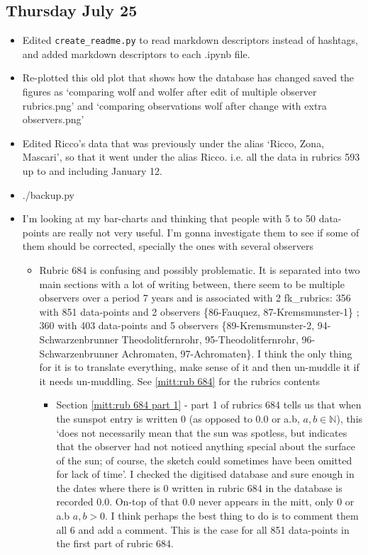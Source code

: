 \documentclass[12pt]{article}
\newcommand{\N}{\mathbb{N}}
\begin{document}
\subsection{Thursday July 25}
\begin{itemize}
    \item Edited \texttt{create\_readme.py} to read markdown descriptors instead of hashtags, and added markdown descriptors to each .ipynb file.
    \item Re-plotted this old plot that shows how the database has changed saved the figures as `comparing wolf and wolfer after edit of multiple observer rubrics.png' and `comparing observations wolf after change with extra observers.png'
    \item Edited Ricco's data that was previously under the alias `Ricco, Zona, Mascari', so that it went under the alias Ricco. i.e. all the data in rubrics 593 up to and including January 12.
    \item ./backup.py
    \item I'm looking at my bar-charts and thinking that people with 5 to 50 data-points are really not very useful. I'm gonna investigate them to see if some of them should be corrected, specially the ones with several observers
    \begin{itemize}
        \item Rubric 684 is confusing and possibly problematic. It is separated into two main sections with a lot of writing between, there seem to be multiple observers over a period 7 years and is associated with 2 fk\_rubrics: 356 with 851 data-points and 2 observers \{86-Fauquez, 87-Kremsmunster-1\} ; 360 with 403 data-points and 5 observers \{89-Kremsmunster-2, 94-Schwarzenbrunner Theodolitfernrohr, 95-Theodolitfernrohr, 96-Schwarzenbrunner Achromaten, 97-Achromaten\}. I think the only thing for it is to translate everything, make sense of it and then un-muddle it if it needs un-muddling. See \ref{mitt:rub 684} for the rubrics contents
        \begin{itemize}
            \item Section \ref{mitt:rub 684 part 1} - part 1 of rubrics 684 tells us that when the sunspot entry is written 0 (as opposed to 0.0 or a.b, $a,b\in\N$), this `does not necessarily mean that the sun was spotless, but indicates that the observer had not noticed anything special about the surface of the sun; of course, the sketch could sometimes have been omitted for lack of time'. I checked the digitised database and sure enough in the dates where there is 0 written in rubric 684 in the database is recorded 0.0. On-top of that 0.0 never appears in the mitt, only 0 or a.b $a,b>0$. I think perhaps the best thing to do is to comment them all 6 and add a comment. This is the case for all 851 data-points in the first part of rubric 684. 

\end{itemize}
\end{itemize}
\end{itemize}
\end{document}

